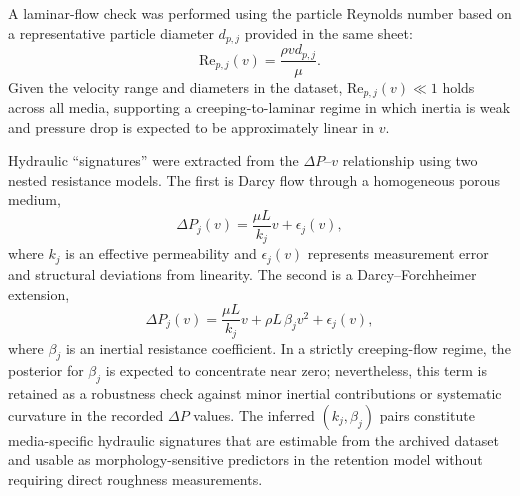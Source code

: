\documentclass[11pt]{article}
\begin{document}
A laminar-flow check was performed using the particle Reynolds number based on a representative particle diameter $d_{p,j}$ provided in the same sheet:
\begin{equation}
\mathrm{Re}_{p,j}(v)=\frac{\rho v d_{p,j}}{\mu}.
\end{equation}
Given the velocity range and diameters in the dataset, $\mathrm{Re}_{p,j}(v)\ll 1$ holds across all media, supporting a creeping-to-laminar regime in which inertia is weak and pressure drop is expected to be approximately linear in $v$.

Hydraulic ``signatures'' were extracted from the $\Delta P$--$v$ relationship using two nested resistance models. The first is Darcy flow through a homogeneous porous medium,
\begin{equation}
\Delta P_{j}(v)=\frac{\mu L}{k_j}v + \epsilon_{j}(v),
\end{equation}
where $k_j$ is an effective permeability and $\epsilon_j(v)$ represents measurement error and structural deviations from linearity. The second is a Darcy--Forchheimer extension,
\begin{equation}
\Delta P_{j}(v)=\frac{\mu L}{k_j}v + \rho L\,\beta_j v^2 + \epsilon_{j}(v),
\end{equation}
where $\beta_j$ is an inertial resistance coefficient. In a strictly creeping-flow regime, the posterior for $\beta_j$ is expected to concentrate near zero; nevertheless, this term is retained as a robustness check against minor inertial contributions or systematic curvature in the recorded $\Delta P$ values. The inferred $(k_j,\beta_j)$ pairs constitute media-specific hydraulic signatures that are estimable from the archived dataset and usable as morphology-sensitive predictors in the retention model without requiring direct roughness measurements.
\end{document}
